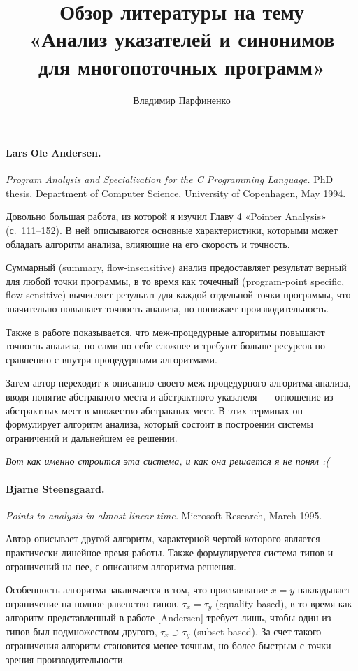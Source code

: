 \documentclass[12pt]{article}
\title{
  Обзор литературы на тему \\
  «Анализ указателей и синонимов\\ для многопоточных программ»
}
\author{
  Владимир Парфиненко
}
\begin{document}
  \maketitle

    \paragraph{Lars Ole Andersen.}
      {\it Program Analysis and Specialization for
        the C Programming Language.}
      PhD thesis, Department of Computer Science, University of Copenhagen,
      May 1994.

      Довольно большая работа, из которой я изучил Главу 4 «Pointer Analysis»
      (с.~111--152). В ней описываются основные характеристики, которыми
      может обладать алгоритм анализа, влияющие на его скорость и точность.

      Суммарный ({\English summary, flow-insensitive}) анализ предоставляет
      результат верный для любой точки программы, в то время как точечный
      ({\English program-point specific, flow-sensitive}) вычисляет результат
      для каждой отдельной точки программы, что значительно повышает точность
      анализа, но понижает производительность.

      Также в работе показывается, что меж-процедурные алгоритмы повышают
      точность анализа, но сами по себе сложнее и требуют больше ресурсов по
      сравнению с внутри-процедурными алгоритмами.

      Затем автор переходит к описанию своего меж-процедурного
      алгоритма анализа, вводя понятие абстракного места и
      абстрактного указателя~--- отношение из абстрактных мест в множество
      абстракных мест. В этих терминах он формулирует алгоритм анализа, который
      состоит в построении системы ограничений и дальнейшем ее решении.

      {\it Вот как именно строится эта система, и как она решается я
      не понял :(}


    \paragraph{Bjarne Steensgaard.}
      {\it Points-to analysis in almost linear time.}
      Microsoft Research,
      March 1995.

      Автор описывает другой алгоритм, характерной чертой которого является
      практически линейное время работы. Также формулируется система типов
      и ограничений на нее, с описанием алгоритма решения.

      Особенность алгоритма заключается в том, что присваивание $x = y$
      накладывает ограничение на полное равенство типов,
      $\tau_x = \tau_y$ ({\English equality-based}),
      в то время как алгоритм представленный в работе [Andersen] требует лишь,
      чтобы один из типов был подмножеством другого,
      $\tau_x \supset \tau_y$ ({\English subset-based}).
      За счет такого ограничения алгоритм становится менее точным, но более
      быстрым с точки зрения производительности.
\end{document}
